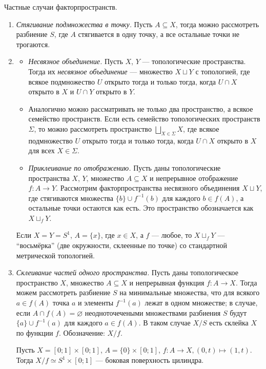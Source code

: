 \documentclass[12pt,a4paper]{article}
\begin{document}
    \begin{definition}
        Частные случаи факторпространств.
        \begin{enumerate}
            \item \emph{Стягивание подмножества в точку.} Пусть $A \subseteq X$, тогда можно рассмотреть разбиение $S$, где $A$ стягивается в одну точку, а все остальные точки не трогаются.

            \item
            \begin{itemize}
                \item \emph{Несвязное объединение.} Пусть $X$, $Y$ --- топологические пространства. Тогда их \emph{несвязное объединение} --- множество $X \sqcup Y$ с топологией, где всякое подмножество $U$ открыто тогда и только тогда, когда $U \cap X$ открыто в $X$ и $U \cap Y$ открыто в $Y$.
                \item Аналогично можно рассматривать не только два пространство, а всякое семейство пространств. Если есть семейство топологических пространств $\Sigma$, то можно рассмотреть пространство $\bigsqcup_{X \in \Sigma} X$, где всякое подмножество $U$ открыто тогда и только тогда, когда $U \cap X$ открыто в $X$ для всех $X \in \Sigma$.
                \item \emph{Приклеивание по отображению.} Пусть даны топологические пространства $X$, $Y$, множество $A \subseteq X$ и непрерывное отображение $f: A \to Y$. Рассмотрим факторпространства несвязного объединения $X \sqcup Y$, где стягиваются множества $\{b\} \cup f^{-1}(b)$ для каждого $b \in f(A)$, а остальные точки остаются как есть. Это пространство обозначается как $X \sqcup_f Y$.
            \end{itemize}
            \begin{example}
                Если $X = Y = S^1$, $A = \{x\}$, где $x \in X$, а $f$ --- любое, то $X \sqcup_f Y$ --- ``восьмёрка'' (две окружности, склеенные по точке) со стандартной метрической топологией.
            \end{example}

            \item \emph{Склеивание частей одного пространства.} Пусть даны топологическое пространство $X$, множество $A \subseteq X$ и непрерывная функция $f: A \to X$. Тогда можем рассмотреть разбиение $S$ на минимальные множества, что для всякого $a \in f(A)$ точка $a$ и элементы $f^{-1}(a)$ лежат в одном множестве; в случае, если $A \cap f(A) = \varnothing$ неодноточечеными множествами разбиения $S$ будут $\{a\} \cup f^{-1}(a)$ для каждого $a \in f(A)$. В таком случае $X/S$ есть склейка $X$ по функции $f$. Обозначение: $X/f$.
            \begin{example}
                Пусть $X = [0; 1] \times [0; 1]$, $A = \{0\} \times [0; 1]$, $f: A \to X, (0, t) \mapsto (1, t)$. Тогда $X/f \simeq S^1 \times [0; 1]$ --- боковая поверхность цилиндра.
            \end{example}


\end{enumerate}
\end{definition}
\end{document}
